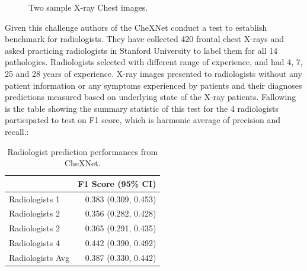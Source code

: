 \documentclass[12pt, twoside, a4paper]{article}
\begin{document}
\begin{figure}[H]%
    \centering
    \qquad
    \caption{Two sample X-ray Chest images.}%
    \label{fig:sample}%
\end{figure}
Given this challenge authors of the CheXNet conduct a test to establish benchmark for radiologists. They have collected 420 frontal chest X-rays and asked practicing radiologists in Stanford University to label them for all 14 pathologies. Radiologists selected with different range of experience, and had 4, 7, 25 and 28 years of experience. X-ray images presented to radiologists without any patient information or any symptoms experienced by patients and their diagnoses predictions measured based on underlying state of the X-ray patients. Fallowing is the table showing the summary statistic of this test for the 4 radiologists participated to test on F1 score, which is harmonic average of precision and recall.\cite{CheXNetRP}:
\begin{table}[h!]
    \centering
     \begin{tabular}{l r} 
     \hline
      & F1 Score (95\% CI) \\ [0.5ex] 
     \hline
     Radiologists 1 & 0.383 (0.309, 0.453) \\ 
     Radiologists 2 & 0.356 (0.282, 0.428) \\
     Radiologists 2 & 0.365 (0.291, 0.435) \\
     Radiologists 4 & 0.442 (0.390, 0.492) \\
     \hline
     Radiologists Avg & 0.387 (0.330, 0.442) \\ [1ex] 
     \hline
     \end{tabular}
     \caption{Radiologist prediction performances from CheXNet.}
     \label{table:radiologist}
\end{table}
\end{document}
